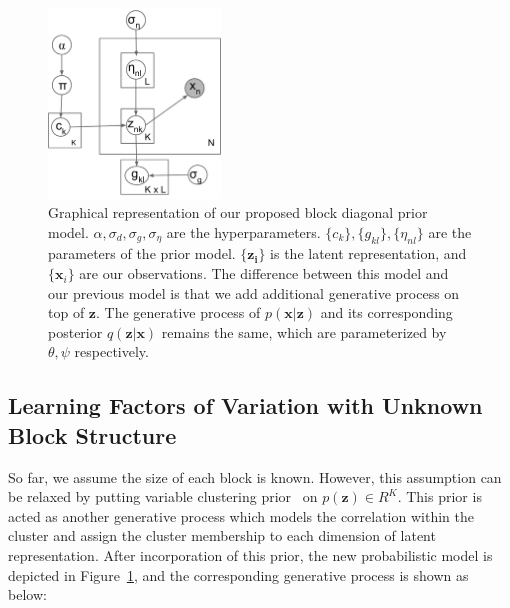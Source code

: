 \begin{figure}[hb]
  \centering
  \includegraphics[width=1.8in]{images/blockmodel.pdf}
  \caption[]
   {Graphical representation of our proposed block diagonal prior model. $\alpha, \sigma_d, \sigma_g, \sigma_{\eta}$ are the hyperparameters. $\{c_k\}, \{g_{kl}\}, \{\eta_{nl}\}$ are the parameters of the prior model. $\{\mathbf{z_i}\}$ is the latent representation, and $\{\mathbf{x}_i\}$ are our observations. The difference between this model and our previous model is that we add additional generative process on top of $\mathbf{z}$. The generative process of $p(\mathbf{x}|\mathbf{z})$ and its corresponding posterior $q(\mathbf{z}|\mathbf{x})$ remains the same, which are parameterized by $\theta, \psi$ respectively. }
  \label{fig:blockprior}
\end{figure}

\subsection{Learning Factors of Variation with Unknown Block Structure}

So far, we assume the size of each block is known. However, this assumption can be relaxed by putting variable clustering prior~\cite{palla2012nonparametric} on $p(\mathbf{z})\in R^K$. This prior is acted as another generative process which models the correlation within the cluster and assign the cluster membership to each dimension of latent representation. After incorporation of this prior, the new probabilistic model is depicted in Figure~\ref{fig:blockprior}, and the corresponding generative process is shown as below:

